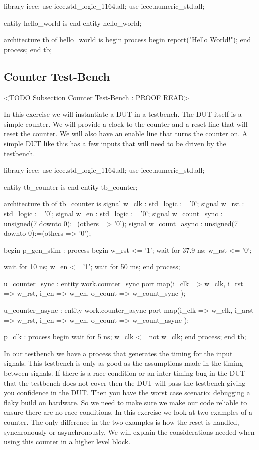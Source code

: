\begin{VHDLlisting}[tabsize=8]
library ieee;
  use ieee.std_logic_1164.all;
  use ieee.numeric_std.all;
  
entity hello_world is
end entity hello_world;

architecture tb of hello_world is
begin
	process
	begin
		report("Hello World!");
	end process;
end tb;
\end{VHDLlisting}
	
	
\subsection{Counter Test-Bench}
	<TODO Subsection Counter Test-Bench : PROOF READ>

In this exercise we will instantiate a \ac{DUT} in a testbench. The \ac{DUT} itself is a simple counter. We will provide a clock to the counter and a reset line that will reset the counter. We will also have an enable line that turns the counter on. A simple \ac{DUT} like this has a few inputs that will need to be driven by the testbench.      
	
\begin{VHDLlisting}
library ieee;
  use ieee.std_logic_1164.all;
  use ieee.numeric_std.all;
  
entity tb_counter is
end entity tb_counter;

architecture tb of tb_counter is
	signal w_clk         : std_logic := '0';
	signal w_rst         : std_logic := '0';
	signal w_en          : std_logic := '0';
	signal w_count_sync  : unsigned(7 downto 0):=(others => '0');
	signal w_count_async : unsigned(7 downto 0):=(others => '0');

begin
	p_gen_stim : process
	begin
		w_rst <= '1';
		wait for 37.9 ns;
		w_rst <= '0';
		
		wait for 10 ns;
		w_en <= '1';
		wait for 50 ms;	
	end process;
	
	u_counter_sync : entity work.counter_sync
	port map(i_clk    => w_clk,
			 i_rst    => w_rst,
			 i_en     => w_en,
			 o_count  => w_count_sync
	);
	
	u_counter_async : entity work.counter_async
	port map(i_clk    => w_clk,
			 i_arst   => w_rst,
			 i_en     => w_en,
			 o_count  => w_count_async
	);
	
	p_clk : process
	begin
		wait for 5 ns;
		w_clk <= not w_clk;
	end process;
end tb;
\end{VHDLlisting}

In our testbench we have a process that generates the timing for the input signals. This testbench is only as good as the assumptions made in the timing between signals. If there is a race condition or an inter-timing bug in the \ac{DUT} that the testbench does not cover then the \ac{DUT} will pass the testbench giving you confidence in the \ac{DUT}. Then you have the worst case scenario: debugging a flaky build on hardware. So we need to make sure we make our code reliable to ensure there are no race conditions. In this exercise we look at two examples of a counter. The only difference in the two examples is how the reset is handled, synchronously or asynchronously. We will explain the considerations needed when using this counter in a higher level block.      

